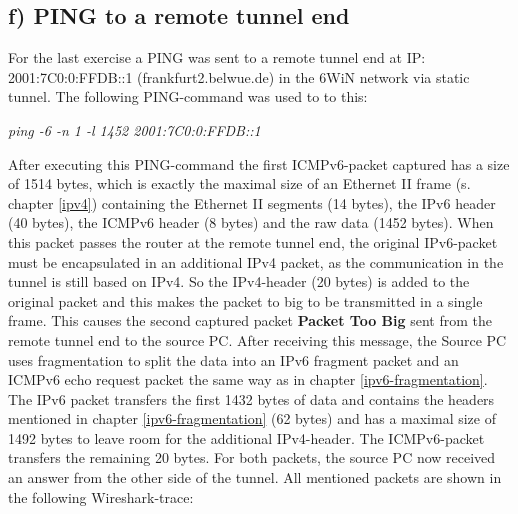 \subsection{f) PING to a remote tunnel end}
For the last exercise a PING was sent to a remote tunnel end at IP: 2001:7C0:0:FFDB::1
(frankfurt2.belwue.de) in the 6WiN network via static tunnel. The following PING-command was used to to this:
\begin{center}
	\textit{ping -6 -n 1 -l 1452 2001:7C0:0:FFDB::1}
\end{center}
After executing this PING-command the first ICMPv6-packet captured has a size of 1514 bytes, which is exactly the maximal size of an Ethernet II frame (s. chapter \ref{ipv4}) containing the Ethernet II segments (14 bytes), the IPv6 header (40 bytes), the ICMPv6 header (8 bytes) and the raw data (1452 bytes). When this packet passes the router at the remote tunnel end, the original IPv6-packet must be encapsulated in an additional IPv4 packet, as the communication in the tunnel is still based on IPv4. So the IPv4-header (20 bytes) is added to the original packet and this makes the packet to big to be transmitted in a single frame. This causes the second captured packet \textbf{Packet Too Big} sent from the remote tunnel end to the source PC. After receiving this message, the Source PC uses fragmentation to split the data into an IPv6 fragment packet and an ICMPv6 echo request packet the same way as in chapter \ref{ipv6-fragmentation}. The IPv6 packet transfers the first 1432 bytes of data and contains the headers mentioned in chapter \ref{ipv6-fragmentation} (62 bytes) and has a maximal size of 1492 bytes to leave room for the additional IPv4-header. The ICMPv6-packet transfers the remaining 20 bytes. For both packets, the source PC now received an answer from the other side of the tunnel. All mentioned packets are shown in the following Wireshark-trace:
\\
